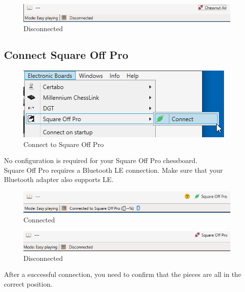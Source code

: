 \documentclass[11pt,a4paper]{article}
\begin{document}
\begin{figure}[H]
	\centering
	\includegraphics[scale=0.7]{ChessnutAir3.png}
	\caption{Disconnected}
	\label{fig:ChessnutAir3}
\end{figure}



\subsection{Connect Square Off Pro} \label{ConfigureSquareOff}
\begin{figure}[H]
	\centering
	\includegraphics[scale=1.0]{SquareOffPro1.png}
	\caption{Connect to Square Off Pro }
	\label{fig:SquareOffPro1}
\end{figure}

No configuration is required for your Square Off Pro chessboard.\\
Square Off Pro requires a Bluetooth LE connection. Make sure that your Bluetooth adapter also supports LE.

\begin{figure}[H]
	\centering
	\includegraphics[scale=0.8]{SquareOffPro2.png}
	\caption{Connected}
	\label{fig:SquareOffPro2}
\end{figure}

\begin{figure}[H]
	\centering
	\includegraphics[scale=0.8]{SquareOffPro3.png}
	\caption{Disconnected}
	\label{fig:SquareOffPro3}
\end{figure}

After a successful connection, you need to confirm that the pieces are all in the correct position.
\end{document}
